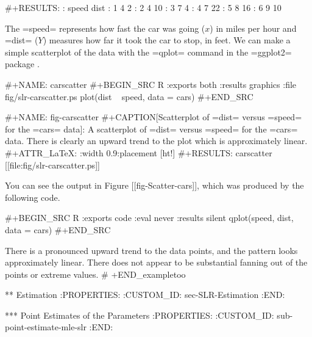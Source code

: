 #+RESULTS:
:   speed dist
: 1     4    2
: 2     4   10
: 3     7    4
: 4     7   22
: 5     8   16
: 6     9   10

The =speed= represents how fast the car was going (\(x\)) in miles per
hour and =dist= (\(Y\)) measures how far it took the car to stop, in
feet. We can make a simple scatterplot of the data with the =qplot=
command in the =ggplot2= package \cite{ggplot2}.

#+NAME: carscatter
#+BEGIN_SRC R :exports both :results graphics :file fig/slr-carscatter.ps
plot(dist ~ speed, data = cars)
#+END_SRC

#+NAME: fig-carscatter
#+CAPTION[Scatterplot of =dist= versus =speed= for the =cars= data]: \small A scatterplot of =dist= versus =speed= for the =cars= data.  There is clearly an upward trend to the plot which is approximately linear. 
#+ATTR_LaTeX: :width 0.9\textwidth :placement [ht!]
#+RESULTS: carscatter
[[file:fig/slr-carscatter.ps]]

You can see the output in Figure [[fig-Scatter-cars]], which was produced by the
following code.

#+BEGIN_SRC R :exports code :eval never :results silent
qplot(speed, dist, data = cars)
#+END_SRC

There is a pronounced upward trend to the data points, and the pattern
looks approximately linear. There does not appear to be substantial
fanning out of the points or extreme values.
# +END_exampletoo

** Estimation
:PROPERTIES:
:CUSTOM_ID: sec-SLR-Estimation
:END:

*** Point Estimates of the Parameters
:PROPERTIES:
:CUSTOM_ID: sub-point-estimate-mle-slr
:END:


